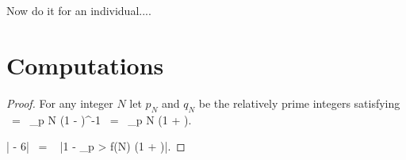 Now do it for an individual....

\newpage

\appendix


\section{Computations}

\begin{proof} For any integer $N$ let $p_N$ and $q_N$ be the
relatively prime integers satisfying
\be
{} \ = \ \prod_{p \le N} \left(1 -
\right)^{-1} \ = \ \prod_{p \le N} \left(1 + \right).
\ee

\lipsum[10]

\be \left| - 6\right| \ = \  \left|1 - \prod_{p > f(N)} \left(1 + \right)\right|.
\ee

\end{proof}


\medskip

\printbibliography



